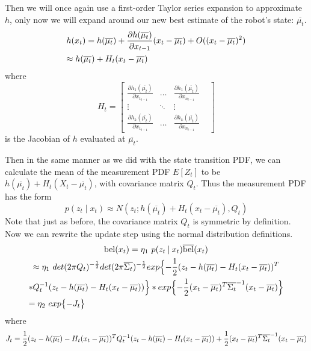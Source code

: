 Then we will once again use a first-order Taylor series expansion to approximate \(h\), only now we will expand around our new best estimate of the robot's state: \(\overline{\mu_t}\).
\begin{multline*}
h(x_t) = h(\overline{\mu_t}) + \frac{\partial h(\overline{\mu_t})}{\partial x_{t-1}} (x_t - \overline{\mu_t}) + O((x_t - \overline{\mu_t})^2) \\
\approx h(\overline{\mu_t}) + H_t (x_t - \overline{\mu_t}) \hfill
\end{multline*}
where \[
H_t = \begin{bmatrix} 
\frac{\partial h_1(\overline{\mu_t})}{\partial x_{1_{t-1}}} & \dots & \frac{\partial h_1(\overline{\mu_t})}{\partial x_{n_{t-1}}}\\
\vdots & \ddots & \vdots & \\
\frac{\partial h_k(\overline{\mu_t})}{\partial x_{1_{t-1}}} & \dots & \frac{\partial h_k(\overline{\mu_t})}{\partial x_{n_{t-1}}} 
\end{bmatrix} \] is the Jacobian of \(h\) evaluated at \(\overline{\mu_t}\).

Then in the same manner as we did with the state transition PDF, we can calculate the mean of the measurement PDF \(E[Z_t]\) to be \(h(\overline{\mu_t}) + H_t (X_t - \overline{\mu_t})\), with covariance matrix \(Q_t\). Thus the measurement PDF has the form \[p(z_t \mathbin{\vert} x_t)  \approx N(z_t;h(\overline{\mu_t}) + H_t (x_t - \overline{\mu_t}),Q_t)\] Note that just as before, the covariance matrix \(Q_t\) is symmetric by definition. Now we can rewrite the update step using the normal distribution definitions.
\begin{multline*}
\bel(x_t) = \eta_1\ p(z_t \mathbin{\vert} x_t) \overline{\bel}(x_t) \\
\approx \eta_1\ det(2 \pi Q_t)^{-\frac{1}{2}} det(2 \pi \overline{\Sigma_t})^{-\frac{1}{2}} exp\Bigl\{-\frac{1}{2} (z_t - h(\overline{\mu_t}) - H_t (x_t - \overline{\mu_t}))^T \\ * Q_t^{-1} (z_t - h(\overline{\mu_t}) - H_t (x_t - \overline{\mu_t}))\Bigr\} * exp \Bigl\{-\frac{1}{2} (x_t - \overline{\mu_t})^T \overline{\Sigma_t}^{-1} (x_t - \overline{\mu_t}) \Bigr\} \\
= \eta_2\ exp\bigl\{-J_t\bigr\} \hfill
\end{multline*} where \[
J_t = \frac{1}{2} (z_t - h(\overline{\mu_t}) - H_t (x_t - \overline{\mu_t}))^T Q_t^{-1} (z_t - h(\overline{\mu_t}) - H_t (x_t - \overline{\mu_t})) \\
+ \frac{1}{2} (x_t - \overline{\mu_t})^T \overline{\Sigma_t}^{-1} (x_t - \overline{\mu_t})
\]

